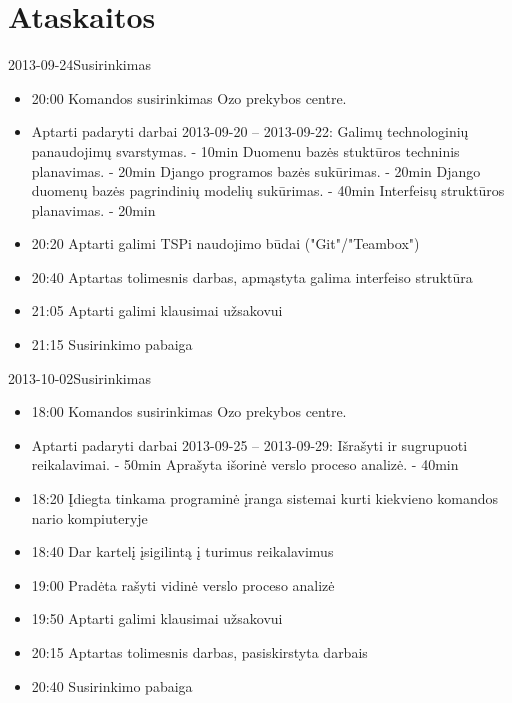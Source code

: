 
%

\section{Ataskaitos}

\begin{loggentry}{2013-09-24}{Susirinkimas}

	\begin{itemize}
		\item 20:00 Komandos susirinkimas Ozo prekybos centre.
		\item Aptarti padaryti darbai 2013-09-20 – 2013-09-22:
			\subitem Galimų technologinių panaudojimų svarstymas. - 10min
			\subitem Duomenu bazės stuktūros techninis planavimas. - 20min
			\subitem Django programos bazės sukūrimas. - 20min
			\subitem Django duomenų bazės pagrindinių modelių sukūrimas. - 40min
			\subitem Interfeisų struktūros planavimas. - 20min
		\item 20:20 Aptarti galimi TSPi naudojimo būdai ("Git"/"Teambox")
		\item 20:40 Aptartas tolimesnis darbas, apmąstyta galima interfeiso struktūra
		\item 21:05 Aptarti galimi klausimai užsakovui
		\item 21:15 Susirinkimo pabaiga
	\end{itemize}
\end{loggentry}

\begin{loggentry}{2013-10-02}{Susirinkimas}

	\begin{itemize}
		\item 18:00 Komandos susirinkimas Ozo prekybos centre.
		\item Aptarti padaryti darbai 2013-09-25 – 2013-09-29:
			\subitem Išrašyti ir sugrupuoti reikalavimai. - 50min
			\subitem Aprašyta išorinė verslo proceso analizė. - 40min
		\item 18:20 Įdiegta tinkama programinė įranga sistemai kurti kiekvieno komandos nario kompiuteryje
		\item 18:40 Dar kartelį įsigilintą į turimus reikalavimus
		\item 19:00 Pradėta rašyti vidinė verslo proceso analizė
		\item 19:50 Aptarti galimi klausimai užsakovui
		\item 20:15 Aptartas tolimesnis darbas, pasiskirstyta darbais
		\item 20:40 Susirinkimo pabaiga
	\end{itemize}
\end{loggentry}


